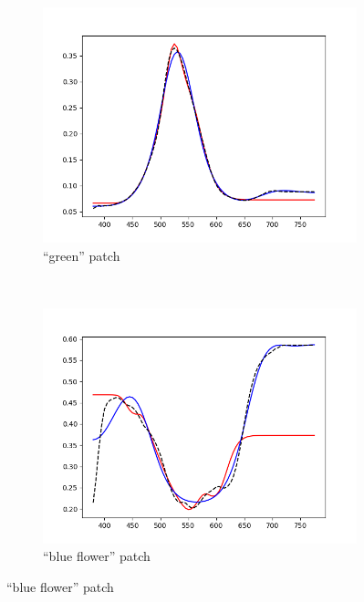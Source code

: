 \begin{figure}[t]
\begin{subfigure}[t]{0.45\textwidth}
		\label{fig:resultsTechnique_neutral5}
	\end{subfigure} \hspace{0.1em}
	\begin{subfigure}[t]{0.45\textwidth}
		\includegraphics[width=\linewidth]{img/results_techniqueGreen.png}
		\caption{``green'' patch}
		\label{fig:resultsTechnique_green}
	\end{subfigure} \hspace{0.1em}
	\vspace{0.5em}\\
	\begin{subfigure}[t]{0.45\textwidth}
		\includegraphics[width=\linewidth]{img/results_techniqueBlueFlower.png}
		\caption{``blue flower'' patch}

\end{subfigure}
\end{figure}
